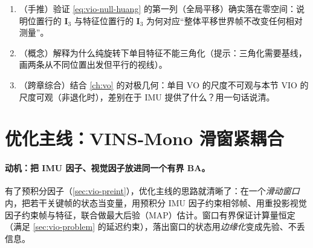 \begin{practice}
\begin{enumerate}
  \item （手推）验证 \cref{eq:vio-null-huang} 的第一列（全局平移）确实落在零空间：说明位置行的 $\mathbf{I}_3$ 与特征位置行的 $\mathbf{I}_3$ 为何对应“整体平移世界帧不改变任何相对测量”。
  \item （概念）解释为什么纯旋转下单目特征不能三角化（提示：三角化需要基线，画两条从不同位置出发但平行的视线）。
  \item （跨章综合）结合 \cref{ch:vo} 的对极几何：单目 VO 的尺度不可观与本节 VIO 的尺度可观（非退化时），差别在于 IMU 提供了什么？用一句话说清。
\end{enumerate}
\end{practice}

\section{优化主线：VINS-Mono 滑窗紧耦合}
\label{sec:vio-opt}

\paragraph{动机：把 IMU 因子、视觉因子放进同一个有界 BA。}
有了预积分因子（\cref{sec:vio-preint}），优化主线的思路就清晰了：在一个\emph{滑动窗口}内，把若干关键帧的状态当变量，用预积分 IMU 因子约束相邻帧、用重投影视觉因子约束帧与特征，联合做最大后验（MAP）估计\cite{qin2018vins}。窗口有界保证计算量恒定（满足 \cref{sec:vio-problem} 的延迟约束），落出窗口的状态用\emph{边缘化}变成先验、不丢信息。

